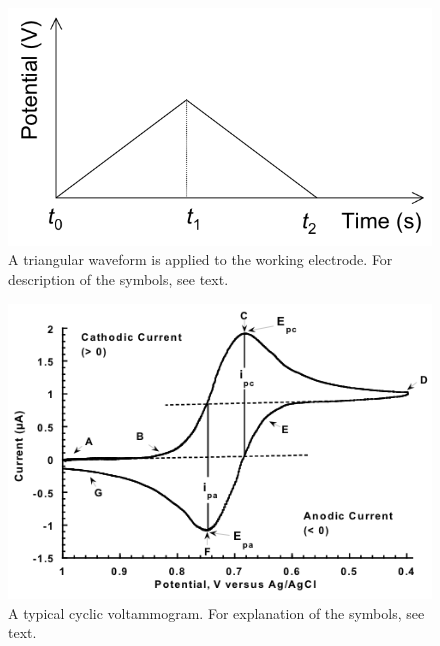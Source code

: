 \documentclass[byrevtex,amssymb,aps,pra,floatfix,letterpaper]{revtex4}
\begin{document}
\begin{figure}[!htp]
\begin{center}
\includegraphics[scale=0.3]{triangle}
\caption{A triangular waveform is applied to the working electrode. For description of the symbols, see text.}
\label{fig3}
\end{center}
\end{figure}

\begin{figure}[!htp]
\begin{center}
\includegraphics[scale=0.4]{voltammogram}
\caption{A typical cyclic voltammogram. For explanation of the symbols, see text.}
\label{fig4}
\end{center}
\end{figure}
\end{document}
